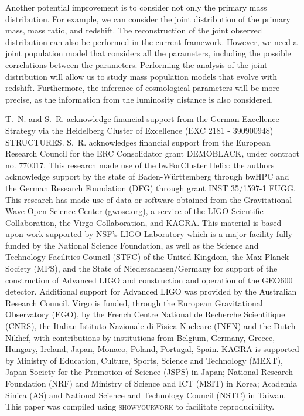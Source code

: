 \documentclass[sn-aps, pdflatex]{sn-jnl}
\begin{document}
Another potential improvement is to consider not only the primary mass distribution.
For example, we can consider the joint distribution of the primary mass, mass ratio, and redshift.
The reconstruction of the joint observed distribution can also be performed in the current framework.
However, we need a joint population model that considers all the parameters, including the possible correlations between the parameters.
Performing the analysis of the joint distribution will allow us to study mass population models that evolve with redshift.
Furthermore, the inference of cosmological parameters will be more precise, as the information from the luminosity distance is also considered.

\backmatter


T.~N. and S.~R. acknowledge financial support from the German Excellence Strategy via the Heidelberg Cluster of Excellence (EXC 2181 - 390900948) STRUCTURES.
S.~R. acknowledges financial support from the European Research Council for the ERC Consolidator grant DEMOBLACK, under contract no. 770017. 
This research made use of the bwForCluster Helix: the authors acknowledge support by the state of Baden-Württemberg through bwHPC and the German Research Foundation (DFG) through grant INST 35/1597-1 FUGG.
This research has made use of data or software obtained from the Gravitational Wave Open Science Center (gwosc.org), a service of the LIGO Scientific Collaboration, the Virgo Collaboration, and KAGRA. This material is based upon work supported by NSF's LIGO Laboratory which is a major facility fully funded by the National Science Foundation, as well as the Science and Technology Facilities Council (STFC) of the United Kingdom, the Max-Planck-Society (MPS), and the State of Niedersachsen/Germany for support of the construction of Advanced LIGO and construction and operation of the GEO600 detector. Additional support for Advanced LIGO was provided by the Australian Research Council. Virgo is funded, through the European Gravitational Observatory (EGO), by the French Centre National de Recherche Scientifique (CNRS), the Italian Istituto Nazionale di Fisica Nucleare (INFN) and the Dutch Nikhef, with contributions by institutions from Belgium, Germany, Greece, Hungary, Ireland, Japan, Monaco, Poland, Portugal, Spain. KAGRA is supported by Ministry of Education, Culture, Sports, Science and Technology (MEXT), Japan Society for the Promotion of Science (JSPS) in Japan; National Research Foundation (NRF) and Ministry of Science and ICT (MSIT) in Korea; Academia Sinica (AS) and National Science and Technology Council (NSTC) in Taiwan.
This paper was compiled using \textsc{showyourwork} \cite{Luger2021} to facilitate reproducibility.


\end{document}
